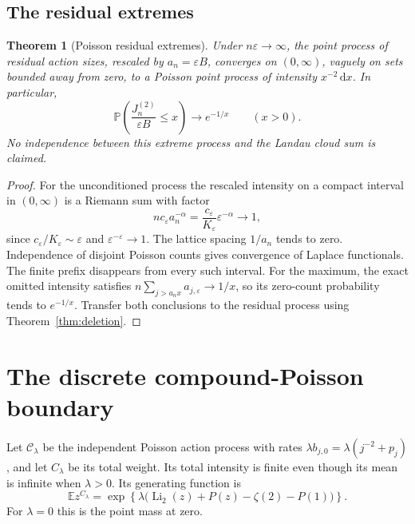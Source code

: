 \documentclass[11pt,a4paper]{article}
\newtheorem{theorem}{Theorem}[section]
\theoremstyle{definition}\newtheorem{definition}[theorem]{Definition}
\theoremstyle{remark}\newtheorem{remark}[theorem]{Remark}
\newcommand{\eps}{\varepsilon}
\newcommand{\Li}{\operatorname{Li}}
\newcommand{\Prob}{\mathbb P}
\newcommand{\E}{\mathbb E}
\newcommand{\1}{\mathbf 1}
\newcommand{\dd}{\,\mathrm d}
\begin{document}
\subsection{The residual extremes}

\begin{theorem}[Poisson residual extremes]\label{thm:extremes}
Under $n\eps\to\infty$, the point process of residual action sizes,
rescaled by $a_n=\eps B$, converges on $(0,\infty)$, vaguely on sets
bounded away from zero, to a Poisson point process of intensity
$x^{-2}\dd x$. In particular,
\begin{equation}\label{eq:secondlargest}
 \Prob\left(\frac{J_n^{(2)}}{\eps B}\le x\right)
 \longrightarrow e^{-1/x}\qquad(x>0).
\end{equation}
No independence between this extreme process and the Landau cloud sum
is claimed.
\end{theorem}
\begin{proof}
For the unconditioned process the rescaled intensity on a compact
interval in $(0,\infty)$ is a Riemann sum with factor
\[
 n c_{\eps}a_n^{-\alpha}
 =\frac{c_{\eps}}{K_{\eps}}\eps^{-\alpha}
 \longrightarrow1,
\]
since $c_{\eps}/K_{\eps}\sim\eps$ and
$\eps^{-\eps}\to1$. The lattice spacing $1/a_n$ tends to zero.
Independence of disjoint Poisson counts gives convergence of Laplace
functionals. The finite prefix disappears from every such interval.
For the maximum, the exact omitted intensity satisfies
$n\sum_{j>a_nx}a_{j,\eps}\to1/x$, so its zero-count probability tends
to $e^{-1/x}$. Transfer both conclusions to the residual process using
Theorem~\ref{thm:deletion}.
\end{proof}

\section{The discrete compound-Poisson boundary}
\label{sec:poisson}

Let $\mathcal C_\lambda$ be the independent Poisson action process with
rates $\lambda b_{j,0}=\lambda(j^{-2}+p_j)$, and let $C_\lambda$ be its
total weight. Its total intensity is finite even though its mean is
infinite when $\lambda>0$. Its generating function is
\begin{equation}\label{eq:CPpgf}
 \E z^{C_\lambda}
 =\exp\left\{\lambda\bigl(\Li_2(z)+P(z)-\zeta(2)-P(1)\bigr)\right\}.
\end{equation}
For $\lambda=0$ this is the point mass at zero.
\end{document}
